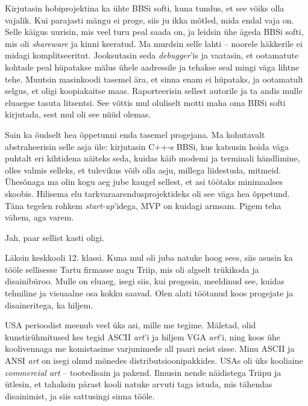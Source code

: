 Kirjutasin hobiprojektina ka ühte BBSi softi, kuna tundus, et see 
võiks olla vajalik. Kui parajasti mängu ei proge, siis ju ikka mõtled, mida endal vaja on. Selle käigus 
uurisin, mis veel turu peal saada on, ja leidsin ühe ägeda BBSi softi, mis oli \emph{shareware} ja kinni keeratud. Ma murdsin selle lahti -- 
noorele häkkerile ei midagi komplitseeritut. Jooksutasin seda 
\emph{debugger}'is ja vaatasin, et ootamatute kohtade peal hüpatakse mälus 
ühele aadressile ja tehakse seal mingi väga lihtne tehe. Muutsin masinkoodi 
tasemel ära, et sinna enam ei hüpataks, ja ootamatult selgus, et oligi 
koopiakaitse maas. Raporteerisin sellest autorile ja ta andis mulle eluaegse tasuta litsentsi. See võttis mul oluliselt 
motti maha oma BBSi softi kirjutada, sest mul oli see nüüd olemas. 

Sain ka õudselt hea õppetunni enda tasemel progejana. 
Ma kohutavalt abstraheerisin selle asja üle: kirjutasin C++-s 
BBSi, kus katsusin hoida väga puhtalt eri kihtidena näiteks seda, kuidas 
käib modemi ja terminali händlimine, olles valmis selleks,
et tulevikus võib olla asju, millega liidestuda, mitmeid. 
Ühesõnaga ma olin kogu aeg jube kaugel sellest, et asi töötaks 
minimaalses skoobis. Hilisema elu tarkvara{\-}arendusprojektideks oli see väga hea 
õppetund. Täna tegelen rohkem \emph{start-up}'idega, MVP on kuidagi 
armsam. Pigem teha vähem, aga varem.


Jah, paar sellist kasti oligi. 


Läksin keskkooli 12. klassi. Kuna mul oli juba natuke hoog sees, 
siis asusin ka tööle sellisesse Tartu firmasse nagu Triip, mis oli 
algselt trükikoda ja disainibüroo. Mulle on eluaeg, isegi siis, kui 
progesin, meeldinud see, kuidas tehniline ja visuaalne osa kokku saavad. 
Olen alati töötanud koos progejate 
ja disaineritega, ka hiljem.

USA perioodist meenub veel üks asi, mille me tegime. Mäletad, olid kunstirühmitused 
kes tegid ASCII \emph{art}'i ja hiljem VGA \emph{art}'i, ning koos ühe koolivennaga me komistasime
varjunimede all paari neist sisse. Minu ASCII ja ANSI \emph{art} on isegi olnud mõnedes distributsioonipakkides. USAs oli üks kooliaine \emph{commercial art} --
tootedisain ja pakend. Ilmusin nende näidistega Triipu ja ütlesin, et 
tahaksin pärast kooli natuke arvuti taga istuda, mis tähendas 
disainimist, ja siis sattusingi sinna tööle.
 
